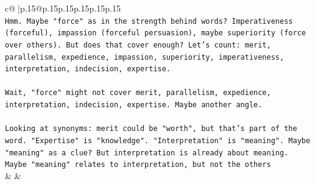 \documentclass{article}
\begin{document}
{\begin{supertabular}{c@{$\;$}|p{.15\linewidth}@{}p{.15\linewidth}p{.15\linewidth}p{.15\linewidth}p{.15\linewidth}p{.15\linewidth}}
{{{\\ 
\texttt{Hmm. Maybe "force" as in the strength behind words? Imperativeness (forceful), impassion (forceful persuasion), maybe superiority (force over others). But does that cover enough? Let's count: merit, parallelism, expedience, impassion, superiority, imperativeness, interpretation, indecision, expertise. } \\
\\ 
\texttt{Wait, "force" might not cover merit, parallelism, expedience, interpretation, indecision, expertise. Maybe another angle. } \\
\\ 
\texttt{Looking at synonyms: merit could be "worth", but that's part of the word. "Expertise" is "knowledge". "Interpretation" is "meaning". Maybe "meaning" as a clue? But interpretation is already about meaning. Maybe "meaning" relates to interpretation, but not the others} \\
            }
        }
    }
    & & \\ \\


\end{supertabular}}
\end{document}
